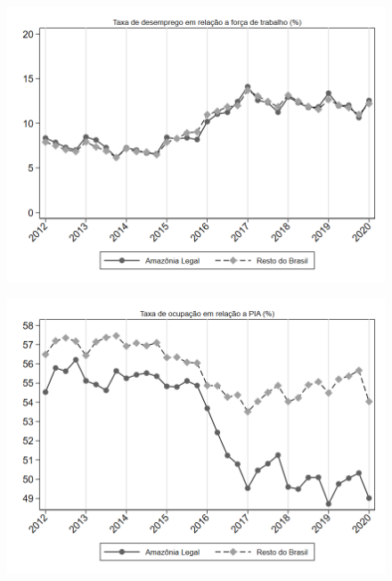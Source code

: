 \documentclass[11pt]{beamer}
\begin{document}
\begin{frame}[label=_estrutura_emprego_taxa_de_desemprego]{}
\begin{figure}
  \centering
  \includegraphics[width=1\linewidth]{../../analysis/output/estrutura_emprego/_estrutura_emprego_taxa_de_desemprego.png}
  \caption{}
  \label{fig:_estrutura_emprego_taxa_de_desemprego}
\end{figure}
\end{frame}

\begin{frame}[label=_estrutura_emprego_taxa_de_ocupacao]{}
\begin{figure}
  \centering
  \includegraphics[width=1\linewidth]{../../analysis/output/estrutura_emprego/_estrutura_emprego_taxa_de_ocupacao.png}
  \caption{}
  \label{fig:_estrutura_emprego_taxa_de_ocupacao}
\end{figure}
\end{frame}
\end{document}
